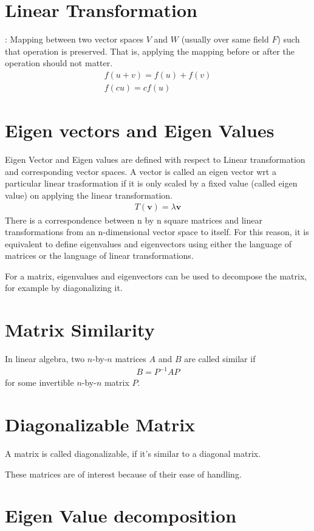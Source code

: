 \documentclass[12pt]{article}
\begin{document}
	\section {Linear Transformation}: 
		Mapping between two vector spaces $V$ and $W$ (usually over same field $F$) such that operation is preserved. That is, applying the mapping before or after the operation should not matter. 
		\begin{gather*}
			f(u+v) = f(u) + f(v) \\
			f(cu) = cf(u)
		\end{gather*}

	\section{Eigen vectors and Eigen Values}
		Eigen Vector and Eigen values are defined with respect to Linear transformation and corresponding vector spaces. A vector is called an eigen vector wrt a particular linear trasformation if it is only scaled by a fixed value (called eigen value) on applying the linear transformation.
		\begin{gather*}
			T(\textbf{v}) = \lambda \textbf{v}
		\end{gather*}
		There is a correspondence between n by n square matrices and linear transformations from an n-dimensional vector space to itself. For this reason, it is equivalent to define eigenvalues and eigenvectors using either the language of matrices or the language of linear transformations.
		
		For a matrix, eigenvalues and eigenvectors can be used to decompose the matrix, for example by diagonalizing it.
	\section {Matrix Similarity}
	In linear algebra, two $n$-by-$n$ matrices $A$ and $B$ are called similar if 
	\begin{gather*}
		B = P^{-1}AP
	\end{gather*}
	for some invertible $n$-by-$n$ matrix $P$.
	\section {Diagonalizable Matrix}
	A matrix is called diagonalizable, if it's similar to a diagonal matrix.
	
	These matrices are of interest because of their ease of handling.
	\section{Eigen Value decomposition}
	
\end{document}
